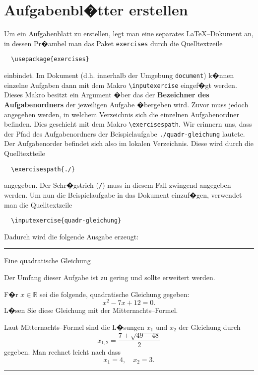\section{Aufgabenbl�tter erstellen}

Um ein Aufgabenblatt zu erstellen, legt man eine separates \LaTeX--Dokument an, in dessen Pr�ambel man das Paket \verb|exercises| durch die Quelltextzeile
\begin{verbatim}
  \usepackage{exercises}
\end{verbatim}
einbindet. Im Dokument (d.h. innerhalb der Umgebung \verb|document|) k�nnen einzelne Aufgaben dann mit dem Makro \verb|\inputexercise| eingef�gt werden. Dieses Makro besitzt ein Argument �ber das der \textbf{Bezeichner des Aufgabenordners} der jeweiligen Aufgabe �bergeben wird. Zuvor muss jedoch angegeben werden, in welchem Verzeichnis sich die einzelnen Aufgabenordner befinden. Dies geschieht mit dem Makro \verb|\exercisespath|. Wir erinnern uns, dass der Pfad des Aufgabenordners der Beispielaufgabe \verb|./quadr-gleichung| lautete. Der Aufgabenorder befindet sich also im lokalen Verzeichnis. Diese wird durch die Quelltextteile
\begin{verbatim}
  \exercisespath{./}
\end{verbatim}  
angegeben. Der Schr�gstrich (\verb|/|) muss in diesem Fall zwingend angegeben werden. Um nun die Beispielaufgabe in das Dokument einzuf�gen, verwendet man die Quelltextzeile
\begin{verbatim}
  \inputexercise{quadr-gleichung}
\end{verbatim}
Dadurch wird die folgende Ausgabe erzeugt:

\vspace*{2em}
\hrule
  \atendexercise{}
  \atendsolution{}
  \atendbody{}
  \worksheetmode
  \nocontentsline
  \setcounter{exercise}{0}
  \begin{exercise}{Eine quadratische Gleichung}

    \begin{comments}
      Der Umfang dieser Aufgabe ist zu gering und 
      sollte erweitert werden.
    \end{comments}

    \begin{body}
      F�r $x \in \mathbb{R}$ sei die folgende, 
      quadratische Gleichung gegeben:
        \[ x^2 - 7x + 12 = 0. \]
      L�sen Sie diese Gleichung mit der
      Mitternachts--Formel. 
    \end{body}

    \begin{solution}
      Laut Mitternachts--Formel sind die L�sungen 
      $x_1$ und $x_2$ der Gleichung durch
        \[ x_{1,2} = \frac{7 \pm \sqrt{49 - 48}}{2} \]
      gegeben. Man rechnet leicht nach dass
        \[ x_1 = 4,\quad x_2 = 3. \]
    \end{solution}
  \end{exercise}
\hrule
\vspace*{2em}

